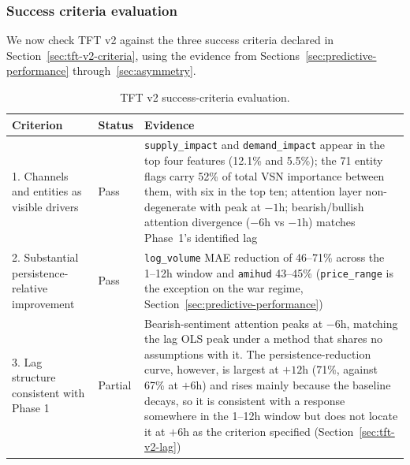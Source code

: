 \subsubsection{Success criteria evaluation}\label{sec:tft-v2-eval}

We now check TFT v2 against the three success criteria declared in Section~\ref{sec:tft-v2-criteria}, using the evidence from Sections~\ref{sec:predictive-performance} through~\ref{sec:asymmetry}.

\begin{table}[h]
  \centering
  \small
  \caption{TFT v2 success-criteria evaluation.}
  \label{tab:success-criteria}
  \begin{tabular}{@{}p{4.5cm}lp{7.5cm}@{}}
    \toprule
    Criterion & Status & Evidence \\
    \midrule
    1. Channels and entities as visible drivers & Pass & \texttt{supply\_impact} and \texttt{demand\_impact} appear in the top four features (12.1\% and 5.5\%); the 71 entity flags carry 52\% of total VSN importance between them, with six in the top ten; attention layer non-degenerate with peak at $-1$h; bearish/bullish attention divergence ($-6$h vs $-1$h) matches Phase~1's identified lag \\
    2. Substantial persistence-relative improvement & Pass & \texttt{log\_volume} MAE reduction of 46--71\% across the 1--12h window and \texttt{amihud} 43--45\% (\texttt{price\_range} is the exception on the war regime, Section~\ref{sec:predictive-performance}) \\
    3. Lag structure consistent with Phase 1 & Partial & Bearish-sentiment attention peaks at $-6$h, matching the lag OLS peak under a method that shares no assumptions with it. The persistence-reduction curve, however, is largest at $+12$h (71\%, against 67\% at $+6$h) and rises mainly because the baseline decays, so it is consistent with a response somewhere in the 1--12h window but does not locate it at $+6$h as the criterion specified (Section~\ref{sec:tft-v2-lag}) \\
    \bottomrule
  \end{tabular}
\end{table}

